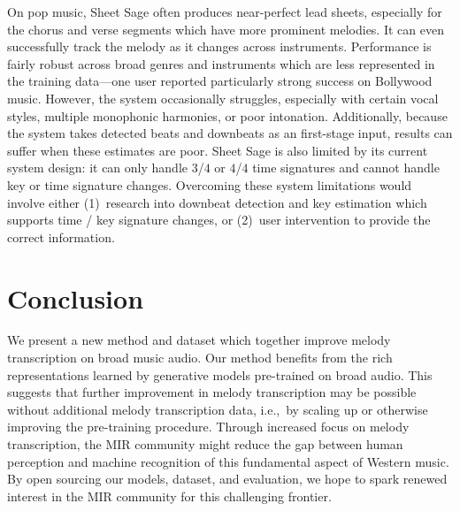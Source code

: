 \documentclass{article}
\newcommand{\sheetsage}{Sheet Sage}
\begin{document}
On pop music, \sheetsage{} often produces near-perfect lead sheets, especially for the chorus and verse segments which have more prominent melodies. 
It can even successfully track the melody as it changes across instruments. 
Performance is fairly robust across broad genres and instruments which are less represented in the training data---one user reported particularly strong success on Bollywood music. 
However, the system occasionally struggles, especially with certain vocal styles, multiple monophonic harmonies, or poor intonation. 
Additionally, because the system takes detected beats and downbeats as an first-stage input, results can suffer when these estimates are poor. 
\sheetsage{} is also limited by its current system design: it can only handle $3$/$4$ or $4$/$4$ time signatures and cannot handle key or time signature changes. 
Overcoming these system limitations would involve either (1)~research into downbeat detection and key estimation which supports time / key signature changes, or (2)~user intervention to provide the correct information.

\section{Conclusion}

We present a new method and dataset which together improve melody transcription on broad music audio. 
Our method benefits from the rich representations learned by generative models pre-trained on broad audio. 
This suggests that further improvement in melody transcription may be possible without additional melody transcription data, i.e.,~by scaling up or otherwise improving the pre-training procedure. 
Through increased focus on melody transcription, the MIR community might reduce the gap between human perception and machine recognition of this fundamental aspect of Western music. 
By open sourcing our models, dataset, and evaluation, we hope to spark renewed interest in the MIR community for this challenging frontier.




\end{document}
